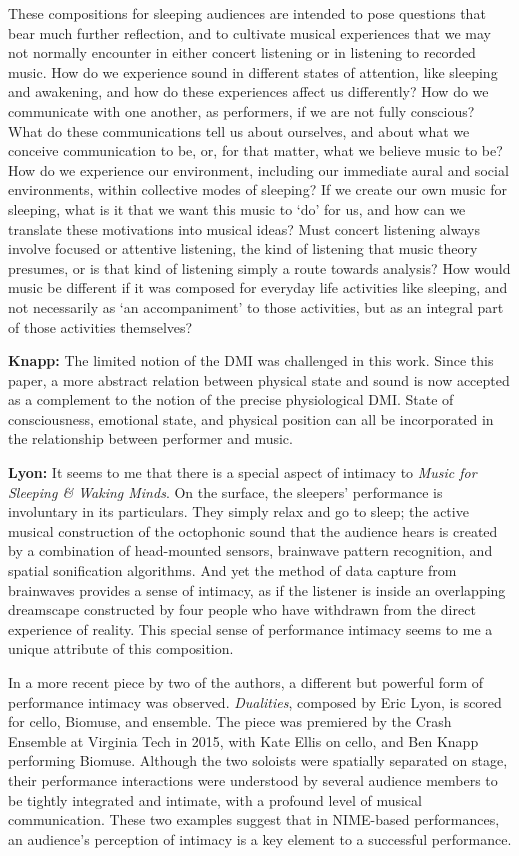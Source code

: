 These compositions for sleeping audiences are intended to pose questions that bear much further reflection, and to cultivate musical experiences that we may not normally encounter in either concert listening or in listening to recorded music. How do we experience sound in different states of attention, like sleeping and awakening, and how do these experiences affect us differently? How do we communicate with one another, as performers, if we are not fully conscious? What do these communications tell us about ourselves, and about what we conceive communication to be, or, for that matter, what we believe music to be? How do we experience our environment, including our immediate aural and social environments, within collective modes of sleeping? If we create our own music for sleeping, what is it that we want this music to `do' for us, and how can we translate these motivations into musical ideas? Must concert listening always involve focused or attentive listening, the kind of listening that music theory presumes, or is that kind of listening simply a route towards analysis? How would music be different if it was composed for everyday life activities like sleeping, and not necessarily as `an accompaniment' to those activities, but as an integral part of those activities themselves?

\textbf{Knapp:} The limited notion of the DMI was challenged in this work. Since this paper, a more abstract relation between physical state and sound is now accepted as a complement to the notion of the precise physiological DMI. State of consciousness, emotional state, and physical position can all be incorporated in the relationship between performer and music.

\textbf{Lyon:} It seems to me that there is a special aspect of intimacy to \textit{Music for Sleeping \& Waking Minds}. On the surface, the sleepers' performance is involuntary in its particulars. They simply relax and go to sleep; the active musical construction of the octophonic sound that the audience hears is created by a combination of head-mounted sensors, brainwave pattern recognition, and spatial sonification algorithms. And yet the method of data capture from brainwaves provides a sense of intimacy, as if the listener is inside an overlapping dreamscape constructed by four people who have withdrawn from the direct experience of reality. This special sense of performance intimacy seems to me a unique attribute of this composition.

In a more recent piece by two of the authors, a different but powerful form of performance intimacy was observed. \textit{Dualities}, composed by Eric Lyon, is scored for cello, Biomuse, and ensemble. The piece was premiered by the Crash Ensemble at Virginia Tech in 2015, with Kate Ellis on cello, and Ben Knapp performing Biomuse. Although the two soloists were spatially separated on stage, their performance interactions were understood by several audience members to be tightly integrated and intimate, with a profound level of musical communication. These two examples suggest that in NIME-based performances, an audience's perception of intimacy is a key element to a successful performance.

